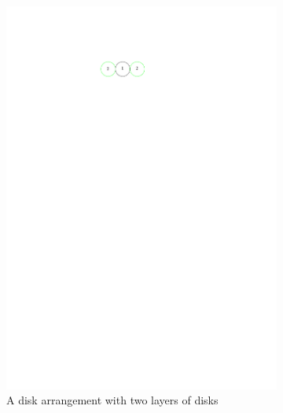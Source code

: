 \begin{figure}[h]
\begin{center}
  \begin{subfigure}[b]{0.24\textwidth}
	  \includegraphics[width=\textwidth]{graphics/degree2arrangement.pdf}
	  \caption{A disk arrangement with two layers of disks}
	  \label{fig:circlePacking1-1}
  \end{subfigure}
  \begin{subfigure}[b]{0.24\textwidth}

\end{subfigure}
\end{center}
\end{figure}
